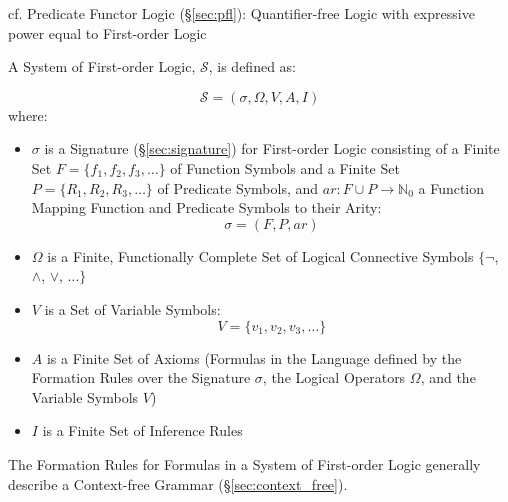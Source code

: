 \fist cf. Predicate Functor Logic (\S\ref{sec:pfl}): Quantifier-free Logic with
expressive power equal to First-order Logic

A System of First-order Logic, $\mathcal{S}$, is defined as:

\[
  \mathcal{S} = (\sigma,\Omega,V,A,I)
\]
where:
\begin{itemize}
  \item $\sigma$ is a Signature (\S\ref{sec:signature}) for First-order Logic
    consisting of a Finite Set $F = \{f_1, f_2, f_3, \ldots \}$ of Function
    Symbols and a Finite Set $P = \{ R_1, R_2, R_3, \ldots\}$ of Predicate
    Symbols, and $ar : F \cup P \rightarrow \mathbb{N}_0$ a Function Mapping
    Function and Predicate Symbols to their Arity:
    \[\sigma = (F,P,ar)\]
  \item $\Omega$ is a Finite, Functionally Complete Set of Logical Connective
    Symbols $\{\neg$, $\wedge$, $\vee$, $\ldots\}$
  \item $V$ is a Set of Variable Symbols:
    \[V = \{v_1, v_2, v_3, \ldots\}\]
  \item $A$ is a Finite Set of Axioms (Formulas in the Language
    defined by the Formation Rules over the Signature $\sigma$, the
    Logical Operators $\Omega$, and the Variable Symbols $V$)
  \item $I$ is a Finite Set of Inference Rules
\end{itemize}

The Formation Rules for Formulas in a System of First-order Logic
generally describe a Context-free Grammar (\S\ref{sec:context_free}).

